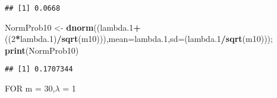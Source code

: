 \documentclass[
]{article}
\newenvironment{Shaded}{\begin{snugshade}}{\end{snugshade}}
\newcommand{\DataTypeTok}[1]{\textcolor[rgb]{0.13,0.29,0.53}{#1}}
\newcommand{\DecValTok}[1]{\textcolor[rgb]{0.00,0.00,0.81}{#1}}
\newcommand{\FloatTok}[1]{\textcolor[rgb]{0.00,0.00,0.81}{#1}}
\newcommand{\KeywordTok}[1]{\textcolor[rgb]{0.13,0.29,0.53}{\textbf{#1}}}
\newcommand{\NormalTok}[1]{#1}
\newcommand{\OperatorTok}[1]{\textcolor[rgb]{0.81,0.36,0.00}{\textbf{#1}}}
\newcommand{\StringTok}[1]{\textcolor[rgb]{0.31,0.60,0.02}{#1}}
\begin{document}
\begin{verbatim}
## [1] 0.0668
\end{verbatim}

\begin{Shaded}
\begin{Highlighting}[]
\NormalTok{NormProb10 <-}\StringTok{ }\KeywordTok{dnorm}\NormalTok{((lambda}\FloatTok{.1}\OperatorTok{+}\NormalTok{((}\DecValTok{2}\OperatorTok{*}\NormalTok{lambda}\FloatTok{.1}\NormalTok{)}\OperatorTok{/}\KeywordTok{sqrt}\NormalTok{(m10))),}\DataTypeTok{mean=}\NormalTok{lambda}\FloatTok{.1}\NormalTok{,}\DataTypeTok{sd=}\NormalTok{(lambda}\FloatTok{.1}\OperatorTok{/}\KeywordTok{sqrt}\NormalTok{(m10))); }\KeywordTok{print}\NormalTok{(NormProb10)}
\end{Highlighting}
\end{Shaded}

\begin{verbatim}
## [1] 0.1707344
\end{verbatim}

FOR m = 30,\(\lambda\) = 1
\end{document}
